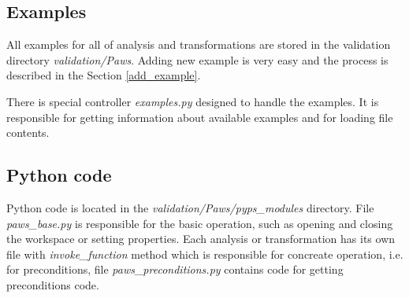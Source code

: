 \subsection{Examples}

All examples for all of analysis and transformations are stored in the validation directory \emph{validation/Paws}. Adding new example is very easy and the process is described in the Section \ref{add_example}.

There is special controller \emph{examples.py} designed to handle the examples. It is responsible for getting information about available examples and for loading file contents.

\subsection{Python code}

Python code is located in the \emph{validation/Paws/pyps\_modules} directory. File \emph{paws\_base.py} is responsible for the basic operation, such as opening and closing the workspace or setting properties. Each analysis or transformation has its own file with \emph{invoke\_function} method which is responsible for concreate operation, i.e. for preconditions, file \emph{paws\_preconditions.py} contains code for getting preconditions code.